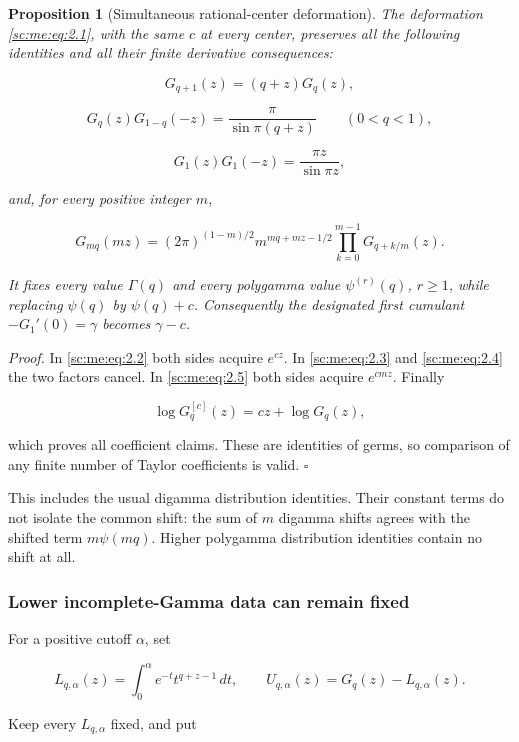 \documentclass[11pt,a4paper]{article}
\newtheorem{proposition}[theorem]{Proposition}
\theoremstyle{definition}
\theoremstyle{remark}
\theoremstyle{plain}
\numberwithin{equation}{section}
\begin{document}
\begin{proposition}[Simultaneous rational-center deformation]\label{sc:me:deformation} The deformation \eqref{sc:me:eq:2.1}, with the same \(c\) at
every center, preserves all the following identities and all their
finite derivative consequences:

\[
G_{q+1}(z)=(q+z)G_q(z),
\tag{ME.2.2}\label{sc:me:eq:2.2}
\]

\[
G_q(z)G_{1-q}(-z)=\frac{\pi}{\sin\pi(q+z)}\qquad(0<q<1),
\tag{ME.2.3}\label{sc:me:eq:2.3}
\]

\[
G_1(z)G_1(-z)=\frac{\pi z}{\sin\pi z},
\tag{ME.2.4}\label{sc:me:eq:2.4}
\]

and, for every positive integer \(m\),

\[
G_{mq}(mz)
=(2\pi)^{(1-m)/2}m^{mq+mz-1/2}
\prod_{k=0}^{m-1}G_{q+k/m}(z).
\tag{ME.2.5}\label{sc:me:eq:2.5}
\]

It fixes every value \(\Gamma(q)\) and every polygamma value
\(\psi^{(r)}(q)\), \(r\ge1\), while replacing \(\psi(q)\) by
\(\psi(q)+c\). Consequently the designated first cumulant
\(-G_1'(0)=\gamma\) becomes \(\gamma-c\).

\end{proposition}
\emph{Proof.} In \eqref{sc:me:eq:2.2} both sides acquire \(e^{cz}\). In \eqref{sc:me:eq:2.3} and \eqref{sc:me:eq:2.4}
the two factors cancel. In \eqref{sc:me:eq:2.5} both sides acquire \(e^{cmz}\). Finally

\[
\log G_q^{[c]}(z)=cz+\log G_q(z),
\]

which proves all coefficient claims. These are identities of germs, so
comparison of any finite number of Taylor coefficients is valid. \(\square\)

This includes the usual digamma distribution identities. Their constant
terms do not isolate the common shift: the sum of \(m\) digamma shifts
agrees with the shifted term \(m\psi(mq)\). Higher polygamma
distribution identities contain no shift at all.

\subsubsection{Lower incomplete-Gamma data can remain
fixed}\label{sc:me:lower-incomplete-gamma-data-can-remain-fixed}

For a positive cutoff \(\alpha\), set

\[
L_{q,\alpha}(z)=\int_0^\alpha e^{-t}t^{q+z-1}\,dt,
\qquad
U_{q,\alpha}(z)=G_q(z)-L_{q,\alpha}(z).
\]

Keep every \(L_{q,\alpha}\) fixed, and put
\end{document}
